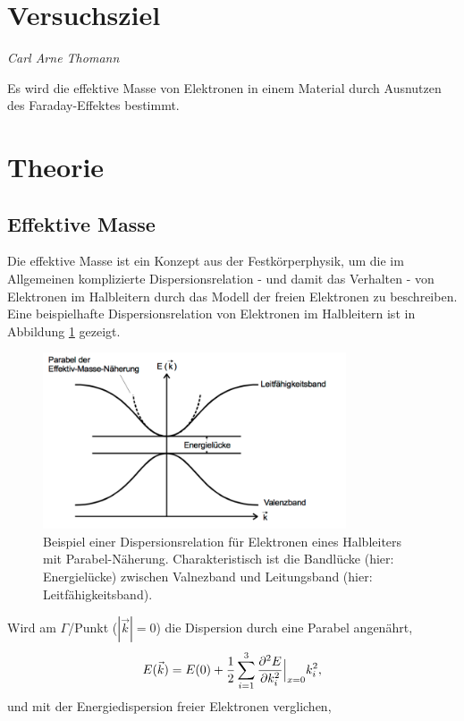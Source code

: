 \section{Versuchsziel}
{\footnotesize \textit{Carl Arne Thomann}}

Es wird die effektive Masse von Elektronen in einem Material durch Ausnutzen des Faraday-Effektes bestimmt.
\section{Theorie}
\label{sec:Theorie}
\subsection{Effektive Masse}
Die effektive Masse ist ein Konzept aus der Festkörperphysik,
um die im Allgemeinen komplizierte Dispersionsrelation - und damit das Verhalten - von Elektronen im Halbleitern
durch das Modell der freien Elektronen zu beschreiben.
Eine beispielhafte Dispersionsrelation von Elektronen im Halbleitern ist in
Abbildung \ref{fig:dispersion} gezeigt.
\begin{figure}
    \centering
    \includegraphics[width=0.8\textwidth]{graphics/dispersion.png}
    \caption{Beispiel einer Dispersionsrelation für Elektronen eines Halbleiters mit Parabel-Näherung. Charakteristisch ist die Bandlücke (hier: Energielücke) zwischen Valnezband und Leitungsband (hier: Leitfähigkeitsband). \cite{skript}}
    \label{fig:dispersion}
\end{figure}
Wird am $\Gamma$\-/Punkt ($|\vec k| = 0$) die Dispersion durch eine Parabel angenährt,
\begin{equation}
    E(\vec k) = E(0) + \frac{1}{2}\sum\limits_{i=1}^3 \frac{\partial^2 E}{\partial k_i^2}\Bigl|_{x=0}k_i^2,
\end{equation}
und mit der Energiedispersion freier Elektronen verglichen, %
